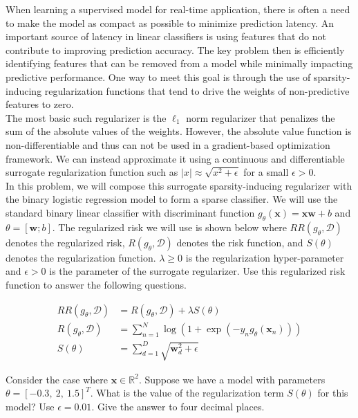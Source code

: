 \documentclass[11pt]{article}
\newcommand{\mbf}[1]{{\mathbf{#1}}}
\begin{document}
\begin{problem}{20} When learning a supervised model for real-time application, there is often a need to make the model as compact as possible to minimize prediction latency. An important source of latency in linear classifiers is using features that do not contribute to improving prediction accuracy. The key problem then is efficiently identifying features that can be removed from a model while minimally impacting predictive performance. One way to meet this goal is through the use of sparsity-inducing regularization functions that tend to drive the weights of non-predictive features to zero. \\

The most basic such regularizer is the $\ell_1$ norm regularizer that penalizes the sum of the absolute values of the weights. However, the absolute value function is non-differentiable and thus can not be used in a gradient-based optimization framework. We can instead approximate it using a continuous and differentiable surrogate regularization function such as $|x| \approx \sqrt{x^2+\epsilon}$ for a small $\epsilon>0$. \\

In this problem, we will compose this surrogate sparsity-inducing regularizer with the binary logistic regression model to form a sparse classifier. We will use the standard binary linear classifier with discriminant function $g_{\theta}(\mbf{x}) = \mbf{x}\mbf{w}+b$ and $\theta=[\mbf{w};b]$. The regularized risk we will use is shown below where $RR(g_{\theta},\mathcal{D})$ denotes the regularized risk, $R(g_{\theta},\mathcal{D})$ denotes the risk function, and $S(\theta)$ denotes the regularization function. $\lambda\geq 0$ is the regularization hyper-parameter and $\epsilon>0$ is the parameter of the surrogate regularizer. Use this regularized risk function to answer the following questions.

\begin{align} 
RR(g_{\theta},\mathcal{D}) &= R(g_{\theta},\mathcal{D}) + \lambda S(\theta) \\
R(g_{\theta},\mathcal{D}) &= \sum_{n=1}^N \log\left(1+\exp(-y_ng_{\theta}(\mbf{x}_n))\right)\\
S(\theta)&=\sum_{d=1}^D \sqrt{\mbf{w}_d^2+\epsilon}
\end{align}

 Consider the case where $\mbf{x}\in\mathbb{R}^2$. Suppose we have a model with parameters $\theta=[-0.3,~2,~1.5]^T$. What is the value of the regularization term $S(\theta)$ for this model? Use $\epsilon = 0.01$. Give the answer to four decimal places.\\


\end{problem}
\end{document}
